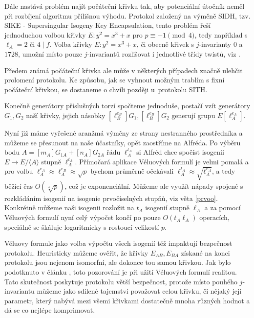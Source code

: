 \documentclass[12pt]{report}
\begin{document}
Dále nastává problém najít počáteční křivku tak, aby potenciální útočník neměl při rozbíjení algoritmu přílišnou výhodu. Protokol založený na výměně SIDH, tzv. SIKE - Supersingular Isogeny Key Encapsulation, tento problém řeší jednoduchou volbou křivky $E : y^2 = x^3+x$ pro $p \equiv -1 \pmod{4}$, tedy například s $\ell_A = 2$ či $4 \mid f$. Volba křivky $E : y^2 = x^3+x$, či obecně křivek s $j$-invarianty $0$ a $1728$, umožní místo pouze $j$-invariantů rozlišovat i jednotlivé třídy twistů, viz \cite{Jao}.

Předem známá počáteční křivka ale může v některých případech značně ulehčit prolomení protokolu. Ke způsobu, jak se vyhnout možným trablím s fixní počáteční křivkou, se dostaneme o chvíli později u~protokolu SITH.

Konečně generátory příslušných torzí spočteme jednoduše, postačí vzít generátory $G_1,G_2$ naší křivky, jejich násobky $[\ell_B ^{e_B}] G_1, [\ell_B ^{e_B}] G_2$ generují grupu $E[\ell_A ^{e_A}]$.

Nyní již máme vyřešené aranžmá výměny ze strany nestranného prostředníka a můžeme se přesunout na naše účastníky, opět zaostříme na Alfréda. Po výběru bodu $A = [m_A] G_{1A} + [n_A] G_{2A}$ řádu $\ell_A ^{t_A}$ si Alfréd chce spočíst isogenii $E \longrightarrow E/\langle A \rangle$ stupně $\ell_A ^{t_A}$. Přímočará aplikace Véluových formulí je velmi pomalá a pro volbu $\ell_A ^{e_A} \approx \ell_A ^{e_B} \approx \sqrt{p}$ bychom průměrně očekávali $\ell_A ^{t_A} \approx \sqrt{\ell_A ^{e_A}}$, a tedy běžící čas $O(\sqrt[4]{p})$, což je exponenciální. Můžeme ale využít nápady spojené s rozkládáním isogenií na isogenie prvočíselných stupňů, viz věta \ref{prvoo}. Konkrétně můžeme naši isogenii rozložit na $t_A$ isogenií stupně $\ell_A$ a za pomocí Véluových formulí nyní celý výpočet končí po pouze $O(t_A \ell_A)$ operacích, speciálně se škáluje logaritmicky s rostoucí velikostí $p$.

Véluovy formule jako volba výpočtu všech isogenií též impaktují bezpečnost protokolu. Heuristicky můžeme ověřit, že křivky $E_{AB},E_{BA}$ získané na konci protokolu jsou nejenom isomorfní, ale dokonce tou samou křivkou. Jak bylo podotknuto v článku \cite{Leonardi}, toto pozorování je při užití Véluových formulí realitou. Tato skutečnost poskytuje protokolu větší bezpečnost, protože místo pouhého $j$-invariantu můžeme jako sdílené tajemství považovat celou křivku, či nějaký její parametr, který nabývá mezi všemi křivkami dostatečně mnoha různých hodnot a dá se co nejlépe komprimovat. 
\end{document}
